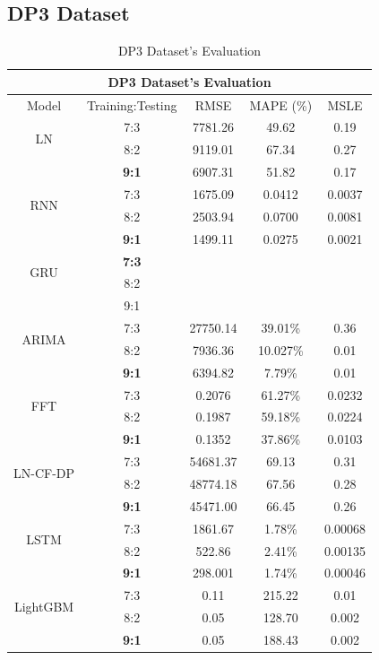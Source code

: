 \documentclass{ieeeojies}
\begin{document}
\subsection{DP3 Dataset}
\begin{table}[H]
    \centering
    \begin{tabular}{|c|c|c|c|c|}
         \hline
         \multicolumn{5}{|c|}{\textbf{DP3 Dataset's Evaluation}}\\
         \hline
         \centering Model & Training:Testing & RMSE & MAPE (\%) & MSLE\\
         \hline
         \multirow{2}{*}{LN}& 7:3 & 7781.26 & 49.62 & 0.19\\ & 8:2 & 9119.01 & 67.34 & 0.27\\ & \textbf{9:1}& 6907.31& 51.82 & 0.17\\
         \hline
         \multirow{2}{*}{RNN} & 7:3&1675.09&0.0412&0.0037\\ & 8:2&2503.94&0.0700&0.0081\\ & \textbf{9:1} & 1499.11&0.0275 &0.0021 \\
         \hline
         \multirow{2}{*}{GRU} & \textbf{7:3}	& & & \\ & 8:2 & & & \\ & 9:1 & & & \\
         \hline
         \multirow{2}{*}{ARIMA} & 7:3 & 27750.14  & 39.01\%  &  0.36 \\ & 8:2 & 7936.36  & 10.027\% & 0.01 \\ & \textbf{9:1} & 6394.82 & 7.79\% & 0.01 \\
         \hline
         \multirow{2}{*}{FFT}& 7:3& 0.2076& 61.27\%&0.0232 \\ & 8:2 & 0.1987& 59.18\%& 0.0224\\ & \textbf{9:1}& 0.1352& 37.86\%& 0.0103\\
         \hline
         \multirow{2}{*}{LN-CF-DP} & 7:3 & 54681.37 & 69.13 & 0.31 \\ & {8:2} & 48774.18 & 67.56 & 0.28 \\ & \textbf{9:1} & 45471.00 &66.45&0.26\\
         \hline
         \multirow{2}{*}{LSTM}& 7:3& 1861.67& 1.78\%& 0.00068\\ & 8:2 & 522.86& 2.41\%& 0.00135\\ & \textbf{9:1}& 298.001& 1.74\%& 0.00046\\
         \hline
         \multirow{2}{*}{LightGBM}& 7:3& 0.11& 215.22 & 0.01\\ & 8:2 & 0.05& 128.70 & 0.002\\ & \textbf{9:1}& 0.05& 188.43 & 0.002\\
         \hline
    \end{tabular}
    \caption{DP3 Dataset's Evaluation}
    \label{dp3result}
\end{table}
\end{document}
